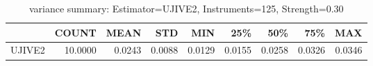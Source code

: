 \begin{table}[ht]
\centering
\caption{variance summary: Estimator=UJIVE2, Instruments=125, Strength=0.30}
\begin{tabular}{lrrrrrrrr}
\toprule
 & COUNT & MEAN & STD & MIN & 25\% & 50\% & 75\% & MAX \\
\midrule
UJIVE2 & 10.0000 & 0.0243 & 0.0088 & 0.0129 & 0.0155 & 0.0258 & 0.0326 & 0.0346 \\
\bottomrule
\end{tabular}
\end{table}
